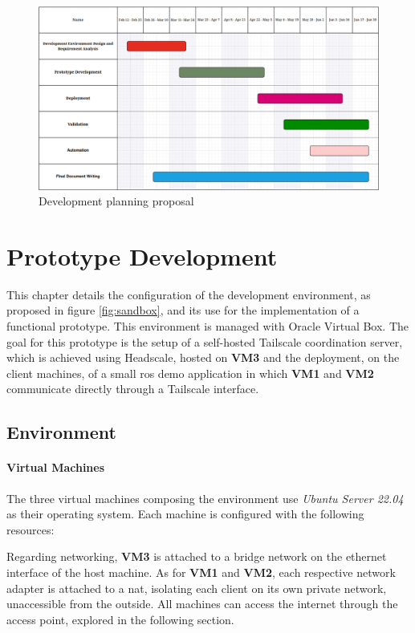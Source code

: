 \documentclass[11pt,twoside,a4paper]{report}
\begin{document}
\begin{figure}[h]
\centering
\includegraphics[width=1\textwidth]{gantt.png}
\caption{Development planning proposal}
\label{fig:gantt}
\end{figure}

\chapter{Prototype Development}

This chapter details the configuration of the development environment, as proposed in figure \ref{fig:sandbox}, and its use for the implementation of a functional prototype. This environment is managed with Oracle Virtual Box. The goal for this prototype is the setup of a self-hosted Tailscale coordination server, which is achieved using Headscale, hosted on \textbf{VM3} and the deployment, on the client machines, of a small \ac{ros} demo application in which \textbf{VM1} and \textbf{VM2} communicate directly through a Tailscale interface.

\section{Environment}

\subsubsection{Virtual Machines}

The three virtual machines composing the environment use \emph{Ubuntu Server 22.04} as their operating system. Each machine is configured with the following resources:

Regarding networking, \textbf{VM3} is attached to a bridge network on the ethernet interface of the host machine. As for \textbf{VM1} and \textbf{VM2}, each respective network adapter is attached to a \ac{nat}, isolating each client on its own private network, unaccessible from the outside. All machines can access the internet through the access point, explored in the following section.
\end{document}
